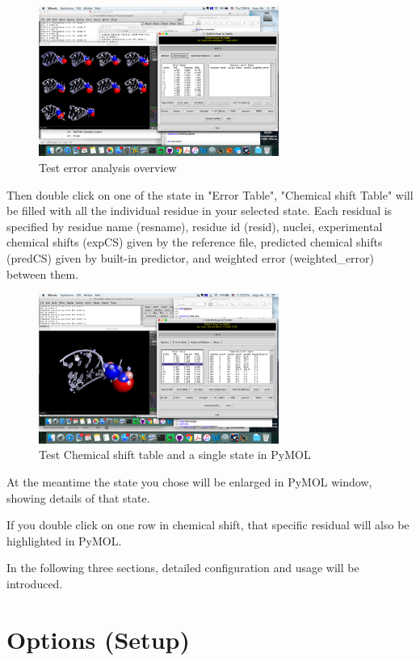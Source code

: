 \documentclass{article}
\begin{document}
 
\begin{figure}[htbp]
\centering
\includegraphics[width=0.7\textwidth]{test3}
\caption{Test error analysis overview}
\label{fig:test3}
\end{figure}
 
Then double click on one of the state in "Error Table", "Chemical shift Table" will be filled with all the individual residue in your selected state. Each residual is specified by residue name (resname), residue id (resid), nuclei, experimental chemical shifts (expCS) given by the reference file, predicted chemical shifts (predCS) given by built-in predictor, and weighted error (weighted\_error) between them.

\begin{figure}[htbp]
\centering
\includegraphics[width=0.7\textwidth]{test4}
\caption{Test Chemical shift table and a single state in PyMOL}
\label{fig:test4}
\end{figure}

At the meantime the state you chose will be enlarged in PyMOL window, showing details of that state.

If you double click on one row in chemical shift, that specific residual will also be highlighted in PyMOL.

In the following three sections, detailed configuration and usage will be introduced.
\newpage
\section{Options (Setup)}
\end{document}
